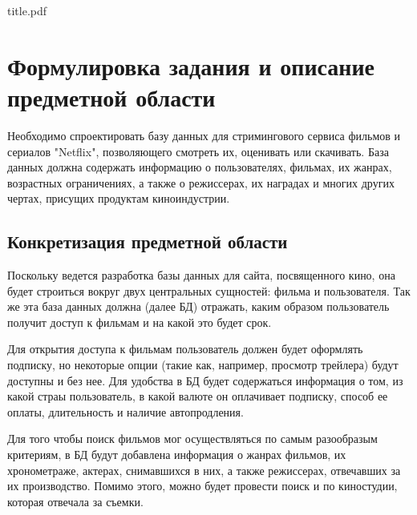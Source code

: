 

\def\oldbibitem{}
\let\oldbibitem=\bibitem
\def\bibitem{\stepcounter{citenum}\oldbibitem}



{title.pdf}

\tableofcontents
\newpage
\section{Формулировка задания и описание предметной области}
Необходимо спроектировать базу данных для стримингового сервиса фильмов и сериалов "Netflix", позволяющего смотреть их, оценивать или скачивать.
База данных должна содержать информацию о пользователях, фильмах, их жанрах, возрастных ограничениях, а также о режиссерах, их наградах и многих других
чертах, присущих продуктам киноиндустрии. 

\subsection{Конкретизация предметной области}
Поскольку ведется разработка базы данных для сайта, посвященного кино, она будет строиться вокруг двух центральных сущностей: фильма и пользователя. 
Так же эта база данных должна (далее БД) отражать, каким образом пользователь получит доступ к фильмам и на какой это будет срок. 

Для открытия доступа к фильмам пользователь должен будет оформлять подписку, но некоторые опции (такие как, например, просмотр трейлера) будут доступны
и без нее. Для удобства в БД будет содержаться информация о том, из какой страы пользователь, в какой валюте он оплачивает подписку, способ ее оплаты, 
длительность и наличие автопродления.

Для того чтобы поиск фильмов мог осуществляться по самым разообразым критериям, в БД будут добавлена информация о жанрах фильмов, их хронометраже, 
актерах, снимавшихся в них, а также режиссерах, отвечавших за их производство. Помимо этого, можно будет провести поиск и по киностудии,
которая отвечала за съемки. 

